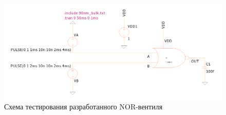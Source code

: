 \begin{figure}[H]
	\centering
	\includegraphics[width=1\textwidth]{../data/test_cmos_nor}
	\caption{Схема тестирования разработанного NOR-вентиля}
\end{figure}
